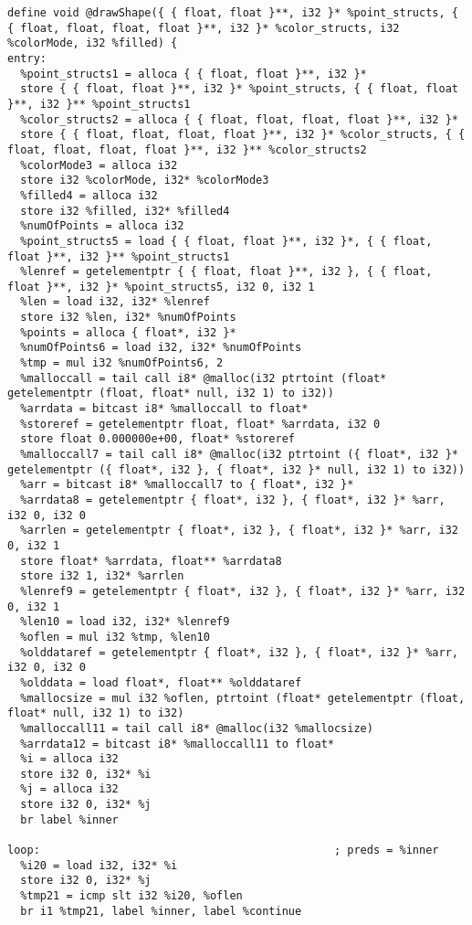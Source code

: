 \documentclass[main.tex]{subfiles}
\begin{document}
{\begin{lstlisting}
define void @drawShape({ { float, float }**, i32 }* %point_structs, { { float, float, float, float }**, i32 }* %color_structs, i32 %colorMode, i32 %filled) {
entry:
  %point_structs1 = alloca { { float, float }**, i32 }*
  store { { float, float }**, i32 }* %point_structs, { { float, float }**, i32 }** %point_structs1
  %color_structs2 = alloca { { float, float, float, float }**, i32 }*
  store { { float, float, float, float }**, i32 }* %color_structs, { { float, float, float, float }**, i32 }** %color_structs2
  %colorMode3 = alloca i32
  store i32 %colorMode, i32* %colorMode3
  %filled4 = alloca i32
  store i32 %filled, i32* %filled4
  %numOfPoints = alloca i32
  %point_structs5 = load { { float, float }**, i32 }*, { { float, float }**, i32 }** %point_structs1
  %lenref = getelementptr { { float, float }**, i32 }, { { float, float }**, i32 }* %point_structs5, i32 0, i32 1
  %len = load i32, i32* %lenref
  store i32 %len, i32* %numOfPoints
  %points = alloca { float*, i32 }*
  %numOfPoints6 = load i32, i32* %numOfPoints
  %tmp = mul i32 %numOfPoints6, 2
  %malloccall = tail call i8* @malloc(i32 ptrtoint (float* getelementptr (float, float* null, i32 1) to i32))
  %arrdata = bitcast i8* %malloccall to float*
  %storeref = getelementptr float, float* %arrdata, i32 0
  store float 0.000000e+00, float* %storeref
  %malloccall7 = tail call i8* @malloc(i32 ptrtoint ({ float*, i32 }* getelementptr ({ float*, i32 }, { float*, i32 }* null, i32 1) to i32))
  %arr = bitcast i8* %malloccall7 to { float*, i32 }*
  %arrdata8 = getelementptr { float*, i32 }, { float*, i32 }* %arr, i32 0, i32 0
  %arrlen = getelementptr { float*, i32 }, { float*, i32 }* %arr, i32 0, i32 1
  store float* %arrdata, float** %arrdata8
  store i32 1, i32* %arrlen
  %lenref9 = getelementptr { float*, i32 }, { float*, i32 }* %arr, i32 0, i32 1
  %len10 = load i32, i32* %lenref9
  %oflen = mul i32 %tmp, %len10
  %olddataref = getelementptr { float*, i32 }, { float*, i32 }* %arr, i32 0, i32 0
  %olddata = load float*, float** %olddataref
  %mallocsize = mul i32 %oflen, ptrtoint (float* getelementptr (float, float* null, i32 1) to i32)
  %malloccall11 = tail call i8* @malloc(i32 %mallocsize)
  %arrdata12 = bitcast i8* %malloccall11 to float*
  %i = alloca i32
  store i32 0, i32* %i
  %j = alloca i32
  store i32 0, i32* %j
  br label %inner

loop:                                             ; preds = %inner
  %i20 = load i32, i32* %i
  store i32 0, i32* %j
  %tmp21 = icmp slt i32 %i20, %oflen
  br i1 %tmp21, label %inner, label %continue


\end{lstlisting}}
\end{document}

